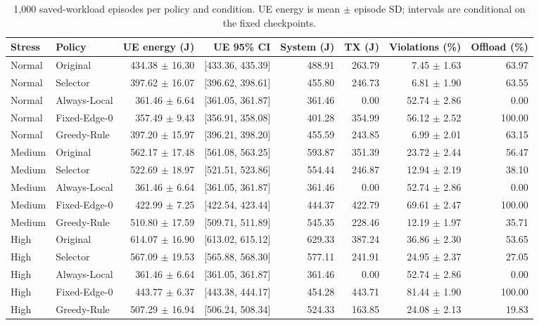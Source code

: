 \begin{table}[t]
\centering\footnotesize
\caption{1,000 saved-workload episodes per policy and condition. UE energy is mean $\pm$ episode SD; intervals are conditional on the fixed checkpoints.}
\label{tab:main}
\begin{tabular}{@{}llrrrrrr@{}}\toprule
Stress & Policy & UE energy (J) & UE 95\% CI & System (J) & TX (J) & Violations (\%) & Offload (\%)\\\midrule
Normal & Original & 434.38 $\pm$ 16.30 & [433.36, 435.39] & 488.91 & 263.79 & 7.45 $\pm$ 1.63 & 63.97 \\
Normal & Selector & 397.62 $\pm$ 16.07 & [396.62, 398.61] & 455.80 & 246.73 & 6.81 $\pm$ 1.90 & 63.55 \\
Normal & Always-Local & 361.46 $\pm$ 6.64 & [361.05, 361.87] & 361.46 & 0.00 & 52.74 $\pm$ 2.86 & 0.00 \\
Normal & Fixed-Edge-0 & 357.49 $\pm$ 9.43 & [356.91, 358.08] & 401.28 & 354.99 & 56.12 $\pm$ 2.52 & 100.00 \\
Normal & Greedy-Rule & 397.20 $\pm$ 15.97 & [396.21, 398.20] & 455.59 & 243.85 & 6.99 $\pm$ 2.01 & 63.15 \\
Medium & Original & 562.17 $\pm$ 17.48 & [561.08, 563.25] & 593.87 & 351.39 & 23.72 $\pm$ 2.44 & 56.47 \\
Medium & Selector & 522.69 $\pm$ 18.97 & [521.51, 523.86] & 554.44 & 246.87 & 12.94 $\pm$ 2.19 & 38.10 \\
Medium & Always-Local & 361.46 $\pm$ 6.64 & [361.05, 361.87] & 361.46 & 0.00 & 52.74 $\pm$ 2.86 & 0.00 \\
Medium & Fixed-Edge-0 & 422.99 $\pm$ 7.25 & [422.54, 423.44] & 444.37 & 422.79 & 69.61 $\pm$ 2.47 & 100.00 \\
Medium & Greedy-Rule & 510.80 $\pm$ 17.59 & [509.71, 511.89] & 545.35 & 228.46 & 12.19 $\pm$ 1.97 & 35.71 \\
High & Original & 614.07 $\pm$ 16.90 & [613.02, 615.12] & 629.33 & 387.24 & 36.86 $\pm$ 2.30 & 53.65 \\
High & Selector & 567.09 $\pm$ 19.53 & [565.88, 568.30] & 577.11 & 241.91 & 24.95 $\pm$ 2.37 & 27.05 \\
High & Always-Local & 361.46 $\pm$ 6.64 & [361.05, 361.87] & 361.46 & 0.00 & 52.74 $\pm$ 2.86 & 0.00 \\
High & Fixed-Edge-0 & 443.77 $\pm$ 6.37 & [443.38, 444.17] & 454.28 & 443.71 & 81.44 $\pm$ 1.90 & 100.00 \\
High & Greedy-Rule & 507.29 $\pm$ 16.94 & [506.24, 508.34] & 524.33 & 163.85 & 24.08 $\pm$ 2.13 & 19.83 \\
\bottomrule\end{tabular}
\end{table}
